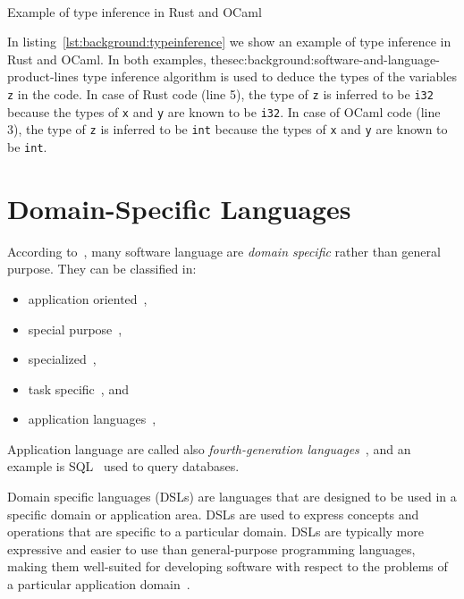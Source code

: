 \begin{Listing}[t]
    \centering
    \mbox{
        \quad
    }
    \caption{Example of type inference in Rust and OCaml}
    \label{lst:background:typeinference}
\end{Listing}

In listing~\ref{lst:background:typeinference} we show an example of type inference in Rust and OCaml. In both examples, thesec:background:software-and-language-product-lines type inference algorithm is used to deduce the types of the variables \texttt{z} in the code. In case of Rust code (line 5), the type of \texttt{z} is inferred to be \texttt{i32} because the types of \texttt{x} and \texttt{y} are known to be \texttt{i32}. In case of OCaml code (line 3), the type of \texttt{z} is inferred to be \texttt{int} because the types of \texttt{x} and \texttt{y} are known to be \texttt{int}.


\section{Domain-Specific Languages}\label{sec:background:DomainSpecificLanguages}

According to~\cite{Mernik05}, many software language are \textit{domain specific} rather than general purpose. They can be classified in:
\begin{itemize}
    \item application oriented~\cite{Sammet69},
    \item special purpose~\cite{Ross78},
    \item specialized~\cite{Bergin96},
    \item task specific~\cite{Nardi93}, and
    \item application languages~\cite{Martin85},
\end{itemize}
Application language are called also \textit{fourth-generation languages}~\cite{Martin85}, and an example is SQL~\cite{Codd70} used to query databases.

Domain specific languages (DSLs) are languages that are designed to be used in a specific domain or application area. DSLs are used to express concepts and operations that are specific to a particular domain. DSLs are typically more expressive and easier to use than general-purpose programming languages, making them well-suited for developing software with respect to the problems of a particular application domain~\cite{VanDeursen00}.

